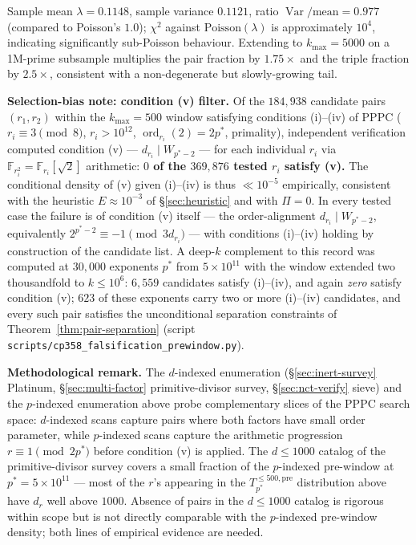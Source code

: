 \documentclass[11pt]{amsart}
\theoremstyle{plain}
\theoremstyle{definition}
\theoremstyle{remark}
\numberwithin{equation}{section}
\newcommand{\ord}{\operatorname{ord}}
\newcommand{\Var}{\operatorname{Var}}
\newcommand{\F}{\mathbb{F}}
\begin{document}
Sample mean $\lambda = 0.1148$, sample variance $0.1121$, ratio $\Var/\text{mean} = 0.977$ (compared to Poisson's $1.0$); $\chi^2$ against $\mathrm{Poisson}(\lambda)$ is approximately $10^4$, indicating significantly sub-Poisson behaviour. Extending to $k_{\max} = 5000$ on a 1M-prime subsample multiplies the pair fraction by $1.75 \times$ and the triple fraction by $2.5 \times$, consistent with a non-degenerate but slowly-growing tail.

\textbf{Selection-bias note: condition (v) filter.} Of the $184{,}938$ candidate pairs $(r_1, r_2)$ within the $k_{\max} = 500$ window satisfying conditions (i)--(iv) of PPPC ($r_i \equiv 3 \pmod 8$, $r_i > 10^{12}$, $\ord_{r_i}(2) = 2 p^\ast$, primality), independent verification computed condition (v) --- $d_{r_i} \mid W_{p^\ast - 2}$ --- for each individual $r_i$ via $\F_{r_i^2} = \F_{r_i}[\sqrt 2]$ arithmetic: \textbf{$0$ of the $369{,}876$ tested $r_i$ satisfy (v).} The conditional density of (v) given (i)--(iv) is thus $\ll 10^{-5}$ empirically, consistent with the heuristic $E \approx 10^{-3}$ of \S\ref{sec:heuristic} and with $\Pi = 0$. In every tested case the failure is of condition (v) itself --- the order-alignment $d_{r_i} \mid W_{p^\ast - 2}$, equivalently $2^{p^\ast - 2} \equiv -1 \pmod{3 d_{r_i}}$ --- with conditions (i)--(iv) holding by construction of the candidate list. A deep-$k$ complement to this record was computed at $30{,}000$ exponents $p^\ast$ from $5 \times 10^{11}$ with the window extended two thousandfold to $k \leq 10^6$: $6{,}559$ candidates satisfy (i)--(iv), and again \emph{zero} satisfy condition (v); $623$ of these exponents carry two or more (i)--(iv) candidates, and every such pair satisfies the unconditional separation constraints of Theorem~\ref{thm:pair-separation} (script \texttt{scripts/}\allowbreak\texttt{cp358\_falsification\_prewindow.py}).

\textbf{Methodological remark.} The $d$-indexed enumeration (\S\ref{sec:inert-survey} Platinum, \S\ref{sec:multi-factor} primitive-divisor survey, \S\ref{sec:nct-verify} sieve) and the $p$-indexed enumeration above probe complementary slices of the PPPC search space: $d$-indexed scans capture pairs where both factors have small order parameter, while $p$-indexed scans capture the arithmetic progression $r \equiv 1 \pmod{2 p^\ast}$ before condition (v) is applied. The $d \leq 1000$ catalog of the primitive-divisor survey covers a small fraction of the $p$-indexed pre-window at $p^\ast = 5 \times 10^{11}$ --- most of the $r$'s appearing in the $T_{p^\ast}^{\leq 500,\mathrm{pre}}$ distribution above have $d_r$ well above $1000$. Absence of pairs in the $d \leq 1000$ catalog is rigorous within scope but is not directly comparable with the $p$-indexed pre-window density; both lines of empirical evidence are needed.
\end{document}
